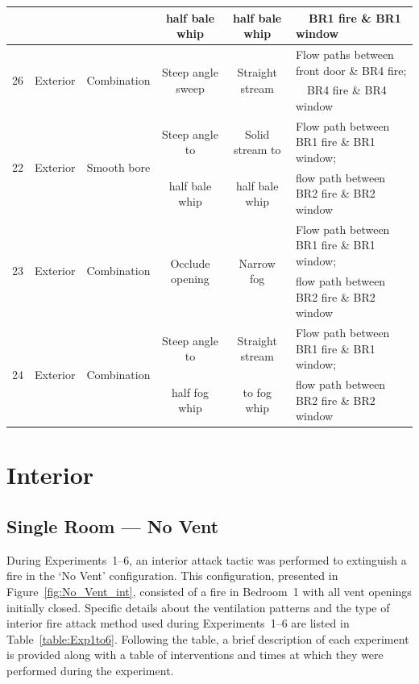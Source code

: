\documentclass[12pt,oneside]{book}
\begin{document}
\begin{table}[!ht]
{\begin{tabular}{|c|c|c|c|c|l|}
 					& 							& 								& half bale whip			&  half bale whip		& ~~BR1 fire \& BR1 window \\
\hline \hline
\multirow{2}{*}{26}	& \multirow{2}{*}{Exterior} & \multirow{2}{*}{Combination} 	& \multirow{2}{*}{Steep angle sweep} &  \multirow{2}{*}{Straight stream} & Flow paths between front door \& BR4 fire; 	\\
 					& 							& 								& 							&  						& ~~BR4 fire \& BR4 window 	\\
\hline \hline
\multirow{2}{*}{22}	& \multirow{2}{*}{Exterior} & \multirow{2}{*}{Smooth bore} 	& Steep angle to 					&  	Solid stream to 	& 	Flow path between BR1 fire \& BR1 window;~ 	\\
 					& 							& 								& half bale whip  					&  	half bale whip 		& 	flow path between BR2 fire \& BR2 window 	\\
\hline
\multirow{2}{*}{23}	& \multirow{2}{*}{Exterior} & \multirow{2}{*}{Combination} 	& \multirow{2}{*}{Occlude opening} 	&  \multirow{2}{*}{Narrow fog} 	& Flow path between BR1 fire \& BR1 window;~ 	\\
 					& 							& 								& 									&  								& flow path between BR2 fire \& BR2 window \\
\hline
\multirow{2}{*}{24}	& \multirow{2}{*}{Exterior} & \multirow{2}{*}{Combination} 	& Steep angle to 					&  Straight stream 		& Flow path between BR1 fire \& BR1 window;~ 	\\
 					& 							& 								& half fog whip						&  to fog whip			& flow path between BR2 fire \& BR2 window 	\\
\hline
\end{tabular}}
\label{table:summary_of_experiments}
\end{table}

\section{Interior}
\subsection{Single Room --- No Vent}

During Experiments~1--6, an interior attack tactic was performed to extinguish a fire in the `No Vent' configuration. This configuration, presented in Figure~\ref{fig:No_Vent_int}, consisted of a fire in Bedroom~1 with all vent openings initially closed. Specific details about the ventilation patterns and the type of interior fire attack method used during Experiments~1--6 are listed in Table~\ref{table:Exp1to6}. Following the table, a brief description of each experiment is provided along with a table of interventions and times at which they were performed during the experiment.  
\end{document}
